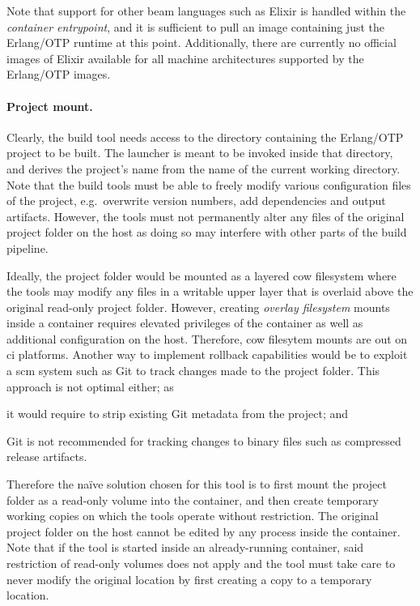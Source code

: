 Note that support for other \acrshort{beam} languages such as Elixir is handled within the \emph{container entrypoint}, and it is sufficient to pull an image containing just the Erlang/OTP runtime at this point. Additionally, there are currently no official images of Elixir available for all machine architectures supported by the Erlang/OTP images.


\paragraph{Project mount.} Clearly, the build tool needs access to the directory containing the Erlang/OTP project to be built. The launcher is meant to be invoked inside that directory, and derives the project's name from the name of the current working directory. Note that the build tools must be able to freely modify various configuration files of the project, e.g.~overwrite version numbers, add dependencies and output artifacts. However, the tools must not permanently alter any files of the original project folder on the host as doing so may interfere with other parts of the build pipeline.

Ideally, the project folder would be mounted as a layered \acrfull{cow} filesystem where the tools may modify any files in a writable upper layer that is overlaid above the original read-only project folder. However, creating \emph{overlay filesystem} mounts inside a container requires elevated privileges of the container as well as additional configuration on the host. Therefore, \acrshort{cow} filesytem mounts are out on \acrshort{ci} platforms. Another way to implement rollback capabilities would be to exploit a \acrfull{scm} system such as Git to track changes made to the project folder. This approach is not optimal either; as \begin{enumerate*}[label=(\roman*)]
  \item it would require to strip existing Git metadata from the project; and
  \item Git is not recommended for tracking changes to binary files such as compressed release artifacts.
\end{enumerate*}

Therefore the naïve solution chosen for this tool is to first mount the project folder as a read-only volume into the container, and then create temporary working copies on which the tools operate without restriction. The original project folder on the host cannot be edited by any process inside the container. Note that if the tool is started inside an already-running container, said restriction of read-only volumes does not apply and the tool must take care to never modify the original location by first creating a copy to a temporary location.


